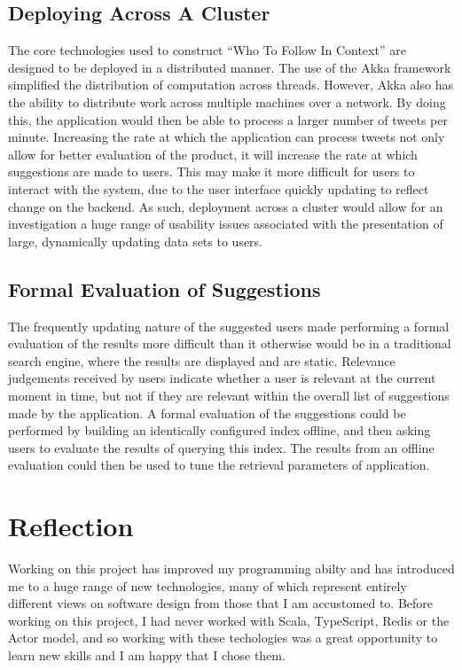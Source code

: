 \documentclass{l4proj}
\begin{document}
        \subsection{Deploying Across A Cluster}
        The core technologies used to construct ``Who To Follow In Context'' are designed to be deployed in a distributed manner. The use of the Akka framework simplified the distribution of computation across threads. However, Akka also has the ability to distribute work across multiple machines over a network. By doing this, the application would then be able to process a larger number of tweets per minute. Increasing the rate at which the application can process tweets not only allow for better evaluation of the product, it will increase the rate at which suggestions are made to users. This may make it more difficult for users to interact with the system, due to the user interface quickly updating to reflect change on the backend. As such, deployment across a cluster would allow for an investigation a huge range of usability issues associated with the presentation of large, dynamically updating data sets to users.
    
        \subsection{Formal Evaluation of Suggestions}
    The frequently updating nature of the suggested users made performing a formal evaluation of the results more difficult than it otherwise would be in a traditional search engine, where the results are displayed and are static. Relevance judgements received by users indicate whether a user is relevant at the current moment in time, but not if they are relevant within the overall list of suggestions made by the application. A formal evaluation of the suggestions could be performed by building an identically configured index offline, and then asking users to evaluate the results of querying this index. The results from an offline evaluation could then be used to tune the retrieval parameters of application.
    
    \section{Reflection}
    Working on this project has improved my programming abilty and has introduced me to a huge range of new technologies, many of which represent entirely different views on software design from those that I am accustomed to. Before working on this project, I had never worked with Scala, TypeScript, Redis or the Actor model, and so working with these techologies was a great opportunity to learn new skills and I am happy that I chose them.
    
\end{document}
